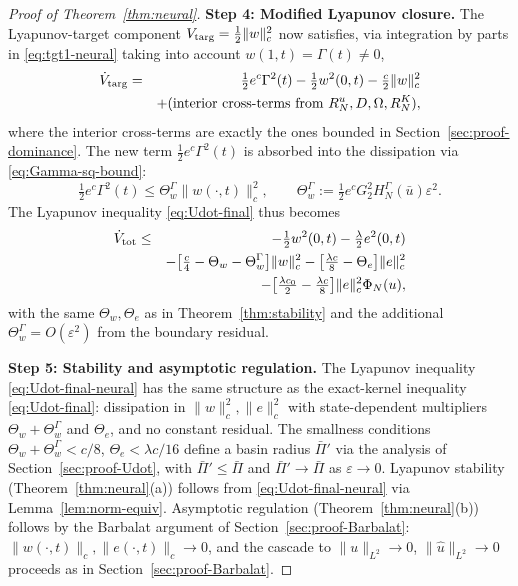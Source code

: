 \documentclass[journal,twoside,web]{ieeecolor}
\begin{document}
\begin{proof}[Proof of Theorem~\ref{thm:neural}]
\medskip\noindent\textbf{Step 4: Modified Lyapunov closure.}
The Lyapunov-target component $V_{\rm targ}=\tfrac12\|w\|_c^2$ now satisfies, via integration by parts in \eqref{eq:tgt1-neural} taking into account $w(1,t)=\Gamma(t)\ne 0$,
\begin{eqnarray}
\dot V_{\rm targ} &=& \tfrac12 e^c\Gamma^2(t)-\tfrac12 w^2(0,t)-\tfrac{c}{2}\|w\|_c^2 \nonumber\\
&& +(\text{interior cross-terms from $R^u_N,D,\Omega,R^K_N$}), \label{eq:Vtarg-dot-passive}
\end{eqnarray}
where the interior cross-terms are exactly the ones bounded in Section~\ref{sec:proof-dominance}. The new term $\tfrac12 e^c\Gamma^2(t)$ is absorbed into the dissipation via \eqref{eq:Gamma-sq-bound}:
\begin{equation}\label{eq:Gamma-absorption}
\tfrac12 e^c\Gamma^2(t)\le \Theta_w^\Gamma\|w(\cdot,t)\|_c^2,\qquad \Theta_w^\Gamma:=\tfrac12 e^c G_2^2 H^\Gamma_N(\bar u)\varepsilon^2.
\end{equation}
The Lyapunov inequality \eqref{eq:Udot-final} thus becomes
\begin{eqnarray}
\dot V_{\rm tot} &\le& -\tfrac12 w^2(0,t)-\tfrac{\lambda}{2}e^2(0,t) \nonumber\\
&& -\bigl[\tfrac{c}{4}-\Theta_w-\Theta_w^\Gamma\bigr]\|w\|_c^2-\bigl[\tfrac{\lambda c}{8}-\Theta_e\bigr]\|e\|_c^2 \nonumber\\
&& -\bigl[\tfrac{\lambda c_0}{2}-\tfrac{\lambda c}{8}\bigr]\|e\|_c^2\Phi_N(u), \label{eq:Udot-final-neural}
\end{eqnarray}
with the same $\Theta_w,\Theta_e$ as in Theorem~\ref{thm:stability} and the additional $\Theta_w^\Gamma=O(\varepsilon^2)$ from the boundary residual.

\medskip\noindent\textbf{Step 5: Stability and asymptotic regulation.}
The Lyapunov inequality \eqref{eq:Udot-final-neural} has the same structure as the exact-kernel inequality \eqref{eq:Udot-final}: dissipation in $\|w\|_c^2,\|e\|_c^2$ with state-dependent multipliers $\Theta_w+\Theta_w^\Gamma$ and $\Theta_e$, and no constant residual. The smallness conditions $\Theta_w+\Theta_w^\Gamma<c/8$, $\Theta_e<\lambda c/16$ define a basin radius $\bar\Pi'$ via the analysis of Section~\ref{sec:proof-Udot}, with $\bar\Pi'\le\bar\Pi$ and $\bar\Pi'\to\bar\Pi$ as $\varepsilon\to 0$. Lyapunov stability (Theorem~\ref{thm:neural}(a)) follows from \eqref{eq:Udot-final-neural} via Lemma~\ref{lem:norm-equiv}. Asymptotic regulation (Theorem~\ref{thm:neural}(b)) follows by the Barbalat argument of Section~\ref{sec:proof-Barbalat}: $\|w(\cdot,t)\|_c,\|e(\cdot,t)\|_c\to 0$, and the cascade to $\|u\|_{L^2}\to 0$, $\|\hat u\|_{L^2}\to 0$ proceeds as in Section~\ref{sec:proof-Barbalat}.


\end{proof}
\end{document}
